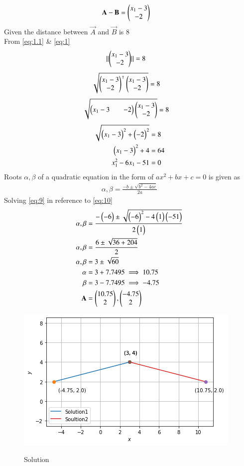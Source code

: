 \documentclass[journal,12pt,twocolumn]{IEEEtran}
\begin{document}
\begin{align}
\\\vec{A-B}&=\myvec{x_1-3\\-2}  %
\end{align}
Given the distance between $\vec{A}$ and $\vec{B}$ is 8
\\From \eqref{eq:1.1} & \eqref{eq:1}
\begin{align}
\lVert\begin{pmatrix}x_1-3\\-2\end{pmatrix}\rVert &=8 \label{eq2}
\end{align}
\begin{align}
\sqrt{\begin{pmatrix}x_1-3\\-2\end{pmatrix}^\intercal\begin{pmatrix}x_1-3\\-2\end{pmatrix}}&=8
\end{align}
\begin{align}
\sqrt{\begin{pmatrix}x_1-3&&-2\end{pmatrix}\begin{pmatrix}x_1-3\\-2\end{pmatrix}}&=8
\end{align}
\begin{align}
\sqrt{\begin{pmatrix}x_1-3\end{pmatrix}^2+\begin{pmatrix}-2\end{pmatrix}^2}&=8
\\\begin{pmatrix}x_1-3\end{pmatrix}^2+4&=64
\\x_1^2-6x_1-51&=0  \label{eq:9}
\end{align}
Roots $\alpha,\beta$ of a quadratic equation in the form of $ax^2+bx+c=0$ is given as 
\begin{align}
\alpha,\beta = \frac{-b\pm\sqrt{b^2-4ac}}{2a} \label{eq:10}
\end{align}
Solving \eqref{eq:9} in reference to \eqref{eq:10}
\begin{align}
\alpha,\beta &= \frac{-\begin{pmatrix}-6\end{pmatrix}\pm\sqrt{\begin{pmatrix}-6\end{pmatrix}^2-4\begin{pmatrix}1\end{pmatrix}\begin{pmatrix}-51\end{pmatrix}}}{2\begin{pmatrix}1\end{pmatrix}}
\\\alpha,\beta &= \frac{6\pm\sqrt{36+204}}{2}
\\\alpha,\beta &= 3\pm\sqrt{60} \nonumber
\\\alpha &= 3+7.7495 \implies 10.75 \nonumber
\\\beta &= 3-7.7495 \implies -4.75  \nonumber
\\\mathbf{A}&=\begin{pmatrix}10.75\\2\end{pmatrix},\begin{pmatrix}-4.75\\2\end{pmatrix}\end{align}
\begin{figure}[!ht]
\includegraphics[width=\columnwidth]{solution.png} \label{fig:image1}
\caption{Solution}
\end{figure}
\end{document}
